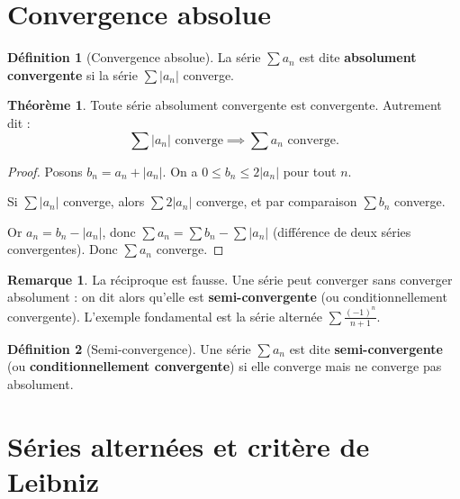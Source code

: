 \documentclass[12pt,a4paper,openany]{book}
\theoremstyle{definition}
\newtheorem{definition}{Définition}[chapter]
\newtheorem{theoreme}{Théorème}[chapter]
\newtheorem{remarque}{Remarque}[chapter]
\newcommand{\abs}[1]{\left\lvert #1 \right\rvert}
\begin{document}
\section{Convergence absolue}\label{sec:series:absolue}

\begin{definition}[Convergence absolue]\label{def:convergence-absolue}
  La série $\sum a_n$ est dite \textbf{absolument convergente} si la série
  $\sum \abs{a_n}$ converge.
\end{definition}

\begin{theoreme}\label{thm:abs-implique-cv}
  Toute série absolument convergente est convergente. Autrement dit :
  \[
    \sum \abs{a_n} \text{ converge} \implies \sum a_n \text{ converge.}
  \]
\end{theoreme}

\begin{proof}
  Posons $b_n = a_n + \abs{a_n}$. On a $0 \leq b_n \leq 2\abs{a_n}$ pour tout $n$.

  Si $\sum \abs{a_n}$ converge, alors $\sum 2\abs{a_n}$ converge, et par comparaison
  $\sum b_n$ converge.

  Or $a_n = b_n - \abs{a_n}$, donc $\sum a_n = \sum b_n - \sum \abs{a_n}$ (différence
  de deux séries convergentes). Donc $\sum a_n$ converge.
\end{proof}

\begin{remarque}
  La réciproque est fausse. Une série peut converger sans converger absolument : on dit
  alors qu'elle est \textbf{semi-convergente} (ou conditionnellement convergente).
  L'exemple fondamental est la série alternée $\sum \frac{(-1)^n}{n+1}$.
\end{remarque}

\begin{definition}[Semi-convergence]\label{def:semi-convergence}
  Une série $\sum a_n$ est dite \textbf{semi-convergente} (ou \textbf{conditionnellement
  convergente}) si elle converge mais ne converge pas absolument.
\end{definition}

\section{Séries alternées et critère de Leibniz}\label{sec:series:alternees}
\end{document}
